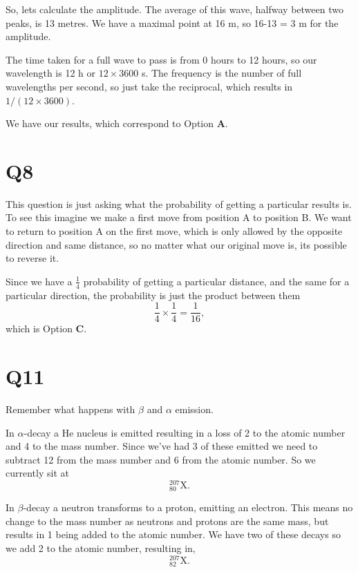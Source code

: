 \documentclass[11pt]{article}
\begin{document}
So, lets calculate the amplitude.  The average of this wave, halfway between two peaks, is 13 metres.  We have a maximal point at 16 m, so 16-13 = 3 m for the amplitude.

The time taken for a full wave to pass is from 0 hours to 12 hours, so our wavelength is 12 h or $12 \times 3600$ s.  The frequency is the number of full wavelengths per second, so just take the reciprocal, which results in $1/(12\times3600)$.  

We have our results, which correspond to Option \textbf{A}.

\section*{Q8}
This question is just asking what the probability of getting a particular results is.  To see this imagine we make a first move from position A to position B.  We want to return to position A on the first move, which is only allowed by the opposite direction and same distance, so no matter what our original move is, its possible to reverse it.

Since we have a $\frac{1}{4}$ probability of getting a particular distance, and the same for a particular direction, the probability is just the product between them
\begin{equation*}
\frac{1}{4} \times \frac{1}{4} = \frac{1}{16},
\end{equation*}
which is Option \textbf{C}.

\section*{Q11}
Remember what happens with $\beta$ and $\alpha$ emission.  

In $\alpha$-decay a He nucleus is emitted resulting in a loss of 2 to the atomic number and 4 to the mass number.  Since we've had 3 of these emitted we need to subtract 12 from the mass number and 6 from the atomic number.  So we currently sit at 
\begin{equation*}
\mathrm{^{207}_{80}X}.
\end{equation*}

In $\beta$-decay a neutron transforms to a proton, emitting an electron.  This means no change to the mass number as neutrons and protons are the same mass, but results in 1 being added to the atomic number.  We have two of these decays so we add 2 to the atomic number, resulting in,
\begin{equation*}
\mathrm{^{207}_{82}X}.
\end{equation*}
\end{document}
